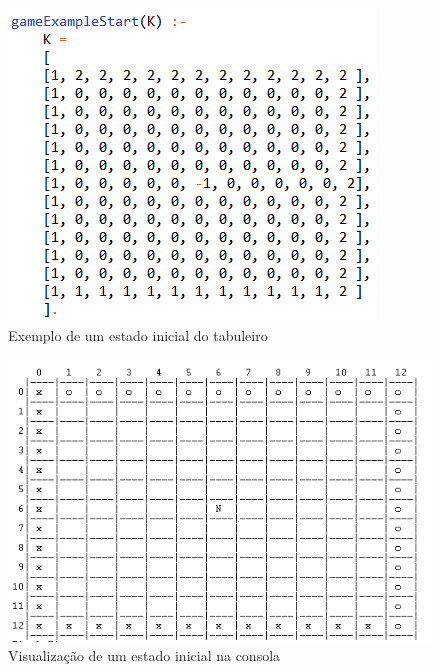 \documentclass[a4paper]{article}
\begin{document}
\begin{figure}
\begin{center}
\includegraphics[scale=0.8]{gamestart.png}
\caption{Exemplo de um estado inicial do tabuleiro}
\end{center}
\end{figure}

\begin{figure}
\begin{center}
\hspace*{-0.1cm}\includegraphics[scale=0.8]{gamestartboard.png}
\caption{Visualização de um estado inicial na consola}
\end{center}
\end{figure}
\end{document}

